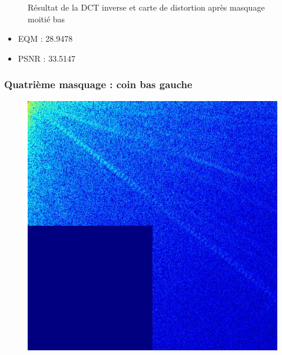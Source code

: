 \documentclass[12pt]{report}
\begin{document}
\begin{figure}[H]
\begin{center}
\caption{Résultat de la DCT inverse et carte de distortion après masquage moitié bas}
\end{center}
\end{figure}

\begin{itemize}
\item EQM : 28.9478
\item PSNR : 33.5147
\end{itemize}

\subsubsection{Quatrième masquage : coin bas gauche}

\begin{figure}[H]
\begin{center}
\includegraphics[scale=0.25]{../ImageRes/dct_masked3_0.jpg} 

\end{center}
\end{figure}
\end{document}
